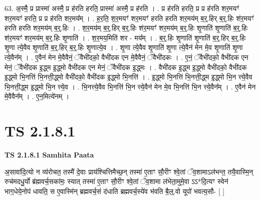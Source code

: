 \documentclass[17pt]{extarticle}
\begin{document}
63. अ॒स्मै॒ प्र प्रास्मा॑ अस्मै॒ प्र ह॑रति हरति॒ प्रास्मा॑ अस्मै॒ प्र ह॑रति । . प्र ह॑रति हरति॒ प्र प्र ह॑रति शर॒मयꣳ॑ शर॒मयꣳ॑ हरति॒ प्र प्र ह॑रति शर॒मय᳚म् । . ह॒र॒ति॒ श॒र॒मयꣳ॑ शर॒मयꣳ॑ हरति हरति शर॒मय॑म् ब॒र्॒.हिर् ब॒र्॒.हिः श॑र॒मयꣳ॑ हरति हरति शर॒मय॑म् ब॒र्॒.हिः । . श॒र॒मय॑म् ब॒र्॒.हिर् ब॒र्॒.हिः श॑र॒मयꣳ॑ शर॒मय॑म् ब॒र्॒.हिः शृ॒णाति॑ शृ॒णाति॑ ब॒र्॒.हिः श॑र॒मयꣳ॑ शर॒मय॑म् ब॒र्॒.हिः शृ॒णाति॑ । . श॒र॒मय॒मिति॑ शर - मय᳚म् । . ब॒र्॒.हिः शृ॒णाति॑ शृ॒णाति॑ ब॒र्॒.हिर् ब॒र्॒.हिः शृ॒णा त्ये॒वैव शृ॒णाति॑ ब॒र्॒.हिर् ब॒र्॒.हिः शृ॒णात्ये॒व । . शृ॒णा त्ये॒वैव शृ॒णाति॑ शृ॒णा त्ये॒वैन॑ मेन मे॒व शृ॒णाति॑ शृ॒णा त्ये॒वैन᳚म् । . ए॒वैन॑ मेन मे॒वैवैनं॒ ॅवैभी॑दको॒ वैभी॑दक एन मे॒वैवैनं॒ ॅवैभी॑दकः । . ए॒नं॒ ॅवैभी॑दको॒ वैभी॑दक एन मेनं॒ ॅवैभी॑दक इ॒द्ध्म इ॒द्ध्मो वैभी॑दक एन मेनं॒ ॅवैभी॑दक इ॒द्ध्मः । . वैभी॑दक इ॒द्ध्म इ॒द्ध्मो वैभी॑दको॒ वैभी॑दक इ॒द्ध्मो भि॒नत्ति॑ भि॒नत्ती॒द्ध्मो वैभी॑दको॒ वैभी॑दक इ॒द्ध्मो भि॒नत्ति॑ । . इ॒द्ध्मो भि॒नत्ति॑ भि॒नत्ती॒द्ध्म इ॒द्ध्मो भि॒न त्त्ये॒वैव भि॒नत्ती॒द्ध्म इ॒द्ध्मो भि॒न त्त्ये॒व । . भि॒नत्त्ये॒वैव भि॒नत्ति॑ भि॒न त्त्ये॒वैन॑ मेन मे॒व भि॒नत्ति॑ भि॒न त्त्ये॒वैन᳚म् । . ए॒वैन॑ मेन मे॒वैवैन᳚म् । . ए॒न॒मित्ये॑नम् । \newline
\pagebreak
{}
\section*{ TS 2.1.8.1 }

\textbf{TS 2.1.8.1 } \newline
\textbf{Samhita Paata} \newline

अ॒सावा॑दि॒त्यो न व्य॑रोचत॒ तस्मै॑ दे॒वाः प्राय॑श्चित्तिमैच्छ॒न् तस्मा॑ ए॒ताꣳ सौ॒रीꣳ श्वे॒तां ॅव॒शामाऽल॑भन्त॒ तयै॒वास्मि॒न् रुच॑मदधु॒र्यो ब्र॑ह्मवर्च॒सका॑मः॒ स्यात् तस्मा॑ ए॒ताꣳ सौ॒रीꣳ श्वे॒तां ॅव॒शामा ल॑भेता॒मुमे॒वा ऽऽ*दि॒त्यꣳ स्वेन॑ भाग॒धेये॒नोप॑ धावति॒ स ए॒वास्मि॑न् ब्रह्मवर्च॒सं द॑धाति ब्रह्मवर्च॒स्ये॑व भ॑वति बै॒ल्॒.वो यूपो॑ भवत्य॒सौ-  [  ] \newline
\end{document}
